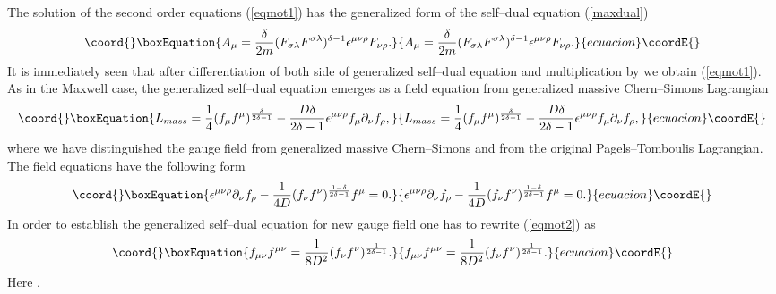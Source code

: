 \documentclass[a4 paper, 12 pt] {article}
\begin{document}
The solution of the second order equations (\ref{eqmot1}) has the
generalized form of the self--dual equation (\ref{maxdual})
\begin{equation}\coord{}\boxEquation{
A_{\mu } = \frac{\delta }{2m} (F_{\sigma \lambda }F^{\sigma \lambda }
)^{\delta -1} \epsilon^{\mu \nu
\rho } F_{\nu \rho }.
\label{selfdual}
}{
A_{\mu } = \frac{\delta }{2m} (F_{\sigma \lambda }F^{\sigma \lambda }
)^{\delta -1} \epsilon^{\mu \nu
\rho } F_{\nu \rho }.
}{ecuacion}\coordE{}\end{equation}
It is immediately seen that after differentiation of both side of
generalized self--dual equation and multiplication by \myHighlight{$\epsilon^{\alpha
\beta \gamma}$}\coordHE{} we obtain (\ref{eqmot1}). As in the Maxwell case, the
generalized self--dual equation emerges as a field equation from
generalized massive Chern--Simons Lagrangian
\begin{equation}\coord{}\boxEquation{
L_{mass}=\frac{1}{4} (f_{\mu} f^{\mu} )^{\frac{\delta }{2 \delta -1}} -
\frac{D \delta }{2\delta -1}
\epsilon^{\mu \nu \rho } f_{\mu } \partial_{\nu } f_{\rho },
\label{dual}
}{
L_{mass}=\frac{1}{4} (f_{\mu} f^{\mu} )^{\frac{\delta }{2 \delta -1}} -
\frac{D \delta }{2\delta -1}
\epsilon^{\mu \nu \rho } f_{\mu } \partial_{\nu } f_{\rho },
}{ecuacion}\coordE{}\end{equation}
where we have distinguished the \coordHE{} gauge field \coordHE{} from
generalized massive Chern--Simons and from the original Pagels--Tomboulis
Lagrangian. The field equations have the following form
\begin{equation}\coord{}\boxEquation{
\epsilon^{\mu \nu \rho } \partial_{\nu } f_{\rho } - \frac{1}{4D}
(f_{\nu} f^{\nu} )^{\frac{1-\delta }{2 \delta -1}} f^{\mu }=0.
\label{eqmot2}
}{
\epsilon^{\mu \nu \rho } \partial_{\nu } f_{\rho } - \frac{1}{4D}
(f_{\nu} f^{\nu} )^{\frac{1-\delta }{2 \delta -1}} f^{\mu }=0.
}{ecuacion}\coordE{}\end{equation}
In order to establish the generalized self--dual equation for new gauge
field \coordHE{} one has to rewrite (\ref{eqmot2}) as
\begin{equation}\coord{}\boxEquation{
f_{\mu \nu } f^{\mu \nu } = \frac{1}{8D^2} (f_{\nu} f^{\nu} )^{\frac{1}{2
\delta -1}}.
\label{f}
}{
f_{\mu \nu } f^{\mu \nu } = \frac{1}{8D^2} (f_{\nu} f^{\nu} )^{\frac{1}{2
\delta -1}}.
}{ecuacion}\coordE{}\end{equation}
Here \coordHE{}.
\end{document}
